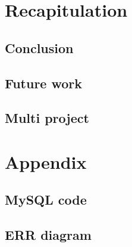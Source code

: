 \chapter{Recapitulation}
  \section{Conclusion}
  \section{Future work}
  \section{Multi project} %

\appendix
	\chapter{Appendix}
	\section{MySQL code}
	\label{MySQLcode}
		
	\section{ERR diagram}
	\label{errDiagram}
		



\appendix


